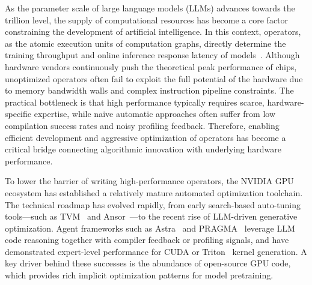 \documentclass{article}
\theoremstyle{plain}
\theoremstyle{definition}
\theoremstyle{remark}
\begin{document}
As the parameter scale of large language models (LLMs) advances towards the trillion level, the supply of computational resources has become a core factor constraining the development of artificial intelligence. 
In this context, operators, as the atomic execution units of computation graphs, directly determine the training throughput and online inference response latency of models~\cite{dao2022flashattention}. 
Although hardware vendors continuously push the theoretical peak performance of chips, unoptimized operators often fail to exploit the full potential of the hardware due to memory bandwidth walls and complex instruction pipeline constraints. 
The practical bottleneck is that high performance typically requires scarce, hardware-specific expertise, while naive automatic approaches often suffer from low compilation success rates and noisy profiling feedback. 
Therefore, enabling efficient development and aggressive optimization of operators has become a critical bridge connecting algorithmic innovation with underlying hardware performance.

To lower the barrier of writing high-performance operators, the NVIDIA GPU ecosystem has established a relatively mature automated optimization toolchain. 
The technical roadmap has evolved rapidly, from early search-based auto-tuning tools---such as TVM~\cite{chen2018tvm} and Ansor~\cite{zheng2020ansor}---to the recent rise of LLM-driven generative optimization. 
Agent frameworks such as Astra~\cite{wei2025astra} and PRAGMA~\cite{lei2025pragma} leverage LLM code reasoning together with compiler feedback or profiling signals, and have demonstrated expert-level performance for CUDA or Triton~\cite{li2025tritonbench} kernel generation. 
A key driver behind these successes is the abundance of open-source GPU code, which provides rich implicit optimization patterns for model pretraining.

\end{document}
